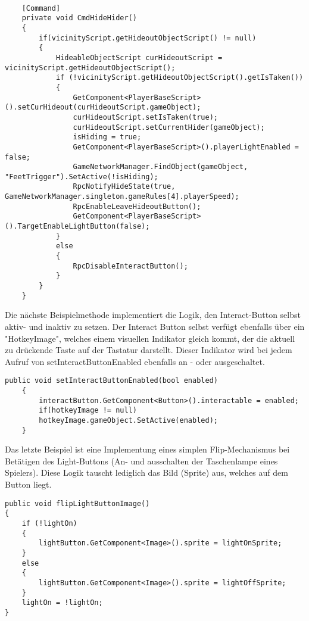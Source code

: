 \begin{lstlisting}[caption= HiderScript.cs Subscribe to InGameUiControllerScript Event]
	
	[Command]
	private void CmdHideHider()
	{
		if(vicinityScript.getHideoutObjectScript() != null)
		{
			HideableObjectScript curHideoutScript = vicinityScript.getHideoutObjectScript();
			if (!vicinityScript.getHideoutObjectScript().getIsTaken())
			{
				GetComponent<PlayerBaseScript>().setCurHideout(curHideoutScript.gameObject);
				curHideoutScript.setIsTaken(true);
				curHideoutScript.setCurrentHider(gameObject);
				isHiding = true;
				GetComponent<PlayerBaseScript>().playerLightEnabled = false;
				GameNetworkManager.FindObject(gameObject, "FeetTrigger").SetActive(!isHiding);
				RpcNotifyHideState(true, GameNetworkManager.singleton.gameRules[4].playerSpeed);
				RpcEnableLeaveHideoutButton();
				GetComponent<PlayerBaseScript>().TargetEnableLightButton(false);
			}
			else
			{
				RpcDisableInteractButton();
			}
		}
	}	
\end{lstlisting}

Die nächste Beispielmethode implementiert die Logik, den Interact-Button selbst aktiv- und inaktiv zu setzen. Der Interact Button selbst verfügt ebenfalls über ein "HotkeyImage", welches einem visuellen Indikator gleich kommt, der die aktuell zu drückende Taste auf der Tastatur darstellt. Dieser Indikator wird bei jedem Aufruf von setInteractButtonEnabled ebenfalls an - oder ausgeschaltet.

\begin{lstlisting}[caption= InGameUiControllerScript.cs setInteractButtonEnabled]
public void setInteractButtonEnabled(bool enabled)
	{
		interactButton.GetComponent<Button>().interactable = enabled;
		if(hotkeyImage != null)
		hotkeyImage.gameObject.SetActive(enabled);
	}
\end{lstlisting}

Das letzte Beispiel ist eine Implementung eines simplen Flip-Mechanismus bei Betätigen des Light-Buttons (An- und ausschalten der Taschenlampe eines Spielers). Diese Logik tauscht lediglich das Bild (Sprite) aus, welches auf dem Button liegt.

\begin{lstlisting}[caption= InGameUiControllerScript.cs flipLightButtonImage]
public void flipLightButtonImage()
{
	if (!lightOn)
	{
		lightButton.GetComponent<Image>().sprite = lightOnSprite;
	}
	else
	{
		lightButton.GetComponent<Image>().sprite = lightOffSprite;
	}
	lightOn = !lightOn;
}
\end{lstlisting}


